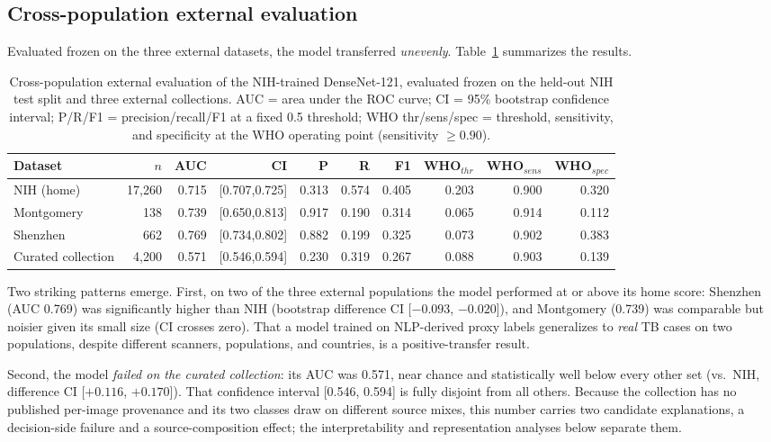 \documentclass[runningheads]{llncs}
\begin{document}
\subsection{Cross-population external evaluation}
Evaluated frozen on the three external datasets, the model transferred \emph{unevenly}. Table~\ref{tab:table1} summarizes the results.

\begin{table}[t]
\centering
\caption{Cross-population external evaluation of the NIH-trained DenseNet-121, evaluated frozen on the held-out NIH test split and three external collections. AUC = area under the ROC curve; CI = 95\% bootstrap confidence interval; P/R/F1 = precision/recall/F1 at a fixed 0.5 threshold; WHO thr/sens/spec = threshold, sensitivity, and specificity at the WHO operating point (sensitivity $\geq 0.90$).}
\label{tab:table1}
\begin{tabular}{lrrrrrrrrr}
\toprule
Dataset & $n$ & AUC & CI & P & R & F1 & WHO$_{thr}$ & WHO$_{sens}$ & WHO$_{spec}$ \\
\midrule
NIH (home) & 17,260 & 0.715 & [0.707,0.725] & 0.313 & 0.574 & 0.405 & 0.203 & 0.900 & 0.320 \\
Montgomery & 138 & 0.739 & [0.650,0.813] & 0.917 & 0.190 & 0.314 & 0.065 & 0.914 & 0.112 \\
Shenzhen & 662 & 0.769 & [0.734,0.802] & 0.882 & 0.199 & 0.325 & 0.073 & 0.902 & 0.383 \\
Curated collection & 4,200 & 0.571 & [0.546,0.594] & 0.230 & 0.319 & 0.267 & 0.088 & 0.903 & 0.139 \\
\bottomrule
\end{tabular}
\end{table}

Two striking patterns emerge. First, on two of the three external populations the model performed at or above its home score: Shenzhen (AUC 0.769) was significantly higher than NIH (bootstrap difference CI [$-0.093$, $-0.020$]), and Montgomery (0.739) was comparable but noisier given its small size (CI crosses zero). That a model trained on NLP-derived proxy labels generalizes to \emph{real} TB cases on two populations, despite different scanners, populations, and countries, is a positive-transfer result.

Second, the model \emph{failed on the curated collection}: its AUC was 0.571, near chance and statistically well below every other set (vs.\ NIH, difference CI [$+0.116$, $+0.170$]). That confidence interval [0.546, 0.594] is fully disjoint from all others. Because the collection has no published per-image provenance and its two classes draw on different source mixes, this number carries two candidate explanations, a decision-side failure and a source-composition effect; the interpretability and representation analyses below separate them.
\end{document}
